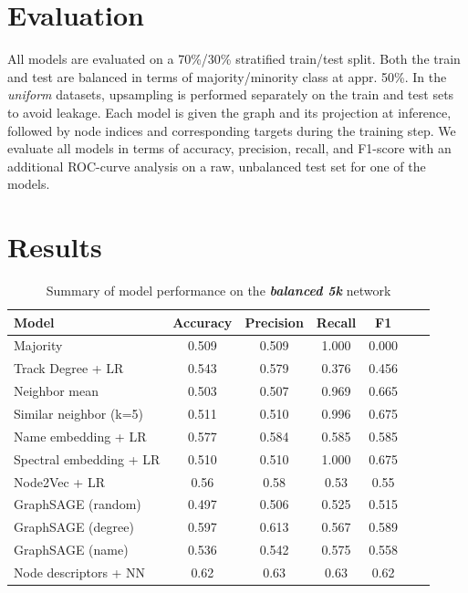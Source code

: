 \documentclass[9pt,twocolumn,twoside]{pnas-report}
\begin{document}
\section{Evaluation}

All models are evaluated on a 70\%/30\% stratified train/test split. Both the train and test are balanced in terms of majority/minority class at appr. 50\%. In the \textit{uniform} datasets, upsampling is performed separately on the train and test sets to avoid leakage. Each model is given the graph and its projection at inference, followed by node indices and corresponding targets during the training step.
We evaluate all models in terms of accuracy, precision, recall, and F1-score with an additional ROC-curve analysis on a raw, unbalanced test set for one of the models.



\section{Results}

\begin{table}[htbp]
\centering
\begin{tabular}{lcccccc}
\toprule
Model & Accuracy & Precision & Recall & F1 \\
\midrule
Majority & 0.509 & 0.509 & 1.000 & 0.000 \\
Track Degree + LR & 0.543 & 0.579 & 0.376 & 0.456 \\
Neighbor mean & 0.503 & 0.507 & 0.969 & 0.665 \\
Similar neighbor (k=5) & 0.511 & 0.510 & 0.996 & 0.675 \\
Name embedding + LR & 0.577 & 0.584 & 0.585 & 0.585 \\
Spectral embedding + LR & 0.510 & 0.510 & 1.000 & 0.675 \\
Node2Vec + LR & 0.56 & 0.58 & 0.53 & 0.55 \\
GraphSAGE (random) & 0.497 & 0.506 & 0.525 & 0.515 \\
GraphSAGE (degree) & 0.597 & 0.613 & 0.567 & 0.589 \\
GraphSAGE (name) & 0.536 & 0.542 & 0.575 & 0.558 \\
Node descriptors + NN & 0.62 & 0.63 & 0.63 & 0.62 \\
\bottomrule
\end{tabular}
\caption{Summary of model performance on the \textit{\textbf{balanced 5k}} network}
\label{tab:res-b5}
\end{table}
\end{document}
